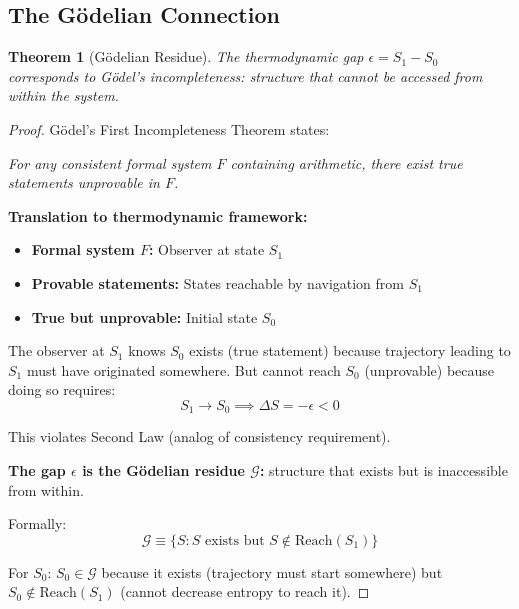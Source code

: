 \documentclass[twocolumn,10pt]{article}
\newtheorem{theorem}{Theorem}[section]
\theoremstyle{definition}
\theoremstyle{remark}
\begin{document}
\subsection{The Gödelian Connection}

\begin{theorem}[Gödelian Residue]
\label{thm:godel_connection}
The thermodynamic gap $\epsilon = S_1 - S_0$ corresponds to Gödel's incompleteness: structure that cannot be accessed from within the system.
\end{theorem}

\begin{proof}
Gödel's First Incompleteness Theorem\cite{godel1931} states:

\textit{For any consistent formal system $F$ containing arithmetic, there exist true statements unprovable in $F$.}

\vspace{0.2cm}
\noindent\textbf{Translation to thermodynamic framework:}

\begin{itemize}
\item \textbf{Formal system $F$:} Observer at state $S_1$
\item \textbf{Provable statements:} States reachable by navigation from $S_1$
\item \textbf{True but unprovable:} Initial state $S_0$
\end{itemize}

\vspace{0.2cm}
\noindent The observer at $S_1$ knows $S_0$ exists (true statement) because trajectory leading to $S_1$ must have originated somewhere. But cannot reach $S_0$ (unprovable) because doing so requires:
\begin{equation}
S_1 \to S_0 \implies \Delta S = -\epsilon < 0
\end{equation}

This violates Second Law (analog of consistency requirement).

\vspace{0.2cm}
\noindent\textbf{The gap $\epsilon$ is the Gödelian residue $\mathcal{G}$:} structure that exists but is inaccessible from within.

Formally:
\begin{equation}
\mathcal{G} \equiv \{S : S \text{ exists but } S \not\in \text{Reach}(S_1)\}
\end{equation}

For $S_0$: $S_0 \in \mathcal{G}$ because it exists (trajectory must start somewhere) but $S_0 \not\in \text{Reach}(S_1)$ (cannot decrease entropy to reach it).
\end{proof}
\end{document}
